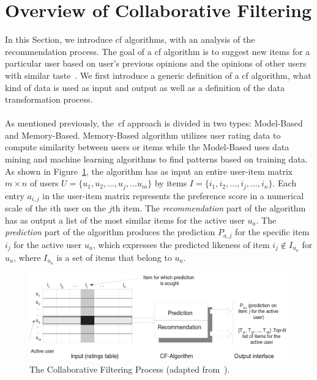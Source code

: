 \section{Overview of Collaborative Filtering}
\label{sec:ocft}

In this Section, we introduce \gls{cf} algorithms, with an analysis of the recommendation process. The goal of a \gls{cf} algorithm is to suggest new items for a particular user based on user's previous opinions and the opinions of other users with similar taste~\cite{ibCollabrativeVSGK}. We first introduce a  generic definition of a \gls{cf} algorithm, what kind of data is used as input and output as well as a definition of the data transformation process.\\
\\
As mentioned previously, the~\gls{cf} approach is divided in two types: Model-Based and Memory-Based. Memory-Based algorithm utilizes user rating data to compute similarity between users or items while the Model-Based uses data mining and machine learning algorithms to find patterns based on training data. As shown in Figure~\ref{fig:cfProcess}, the algorithm has as input an entire user-item matrix $m \times n$
of users $U = \{u_{1}, u_{2}, \dots , u_{j}, \dots u_{m}\}$ 
by items $I = \{i_{1}, i_{2}, \dots , i_{j}, \dots,  i_{n}\}$. Each entry $a_{i,j}$ in the user-item matrix represents the preference score in a numerical scale of the $i$th user on the $j$th item. The \emph{recommendation} part of the algorithm has as output a list of the most similar items for the active user $u_{a}$. The \emph{prediction} part of the algorithm produces the prediction $P_{a,j}$ for the specific item $i_{j}$ for the active user $u_{a}$, which expresses the predicted likeness of item $i_{j} \notin I_{u_{a}}$ for $u_{a}$, where $I_{u_{a}}$ is a set of items that belong to $u_{a}$.
\begin{figure}[h!]
 \centering
   \includegraphics[width=14.5 cm]{./images/flows/flow_cf_algorithm_process.jpg}
   \caption{The Collaborative Filtering Process (adapted from~\cite{ibCollabrativeVSGK}). }
   \label{fig:cfProcess}
\end{figure}
